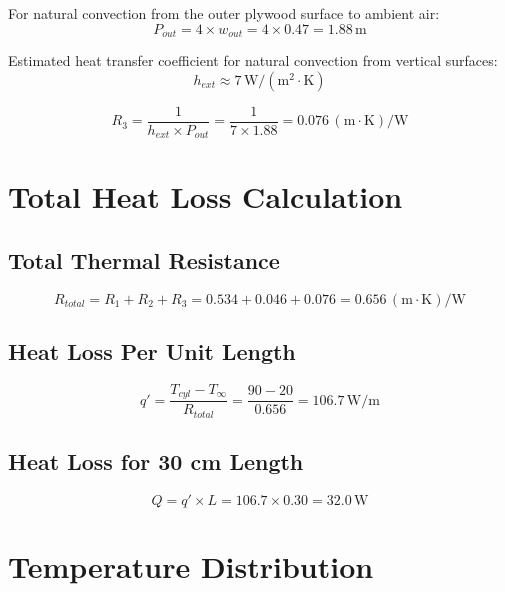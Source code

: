 \documentclass[11pt]{article}
\newcommand{\unit}[1]{\,\mathrm{#1}}
\begin{document}
For natural convection from the outer plywood surface to ambient air:
\begin{equation}
    P_{out} = 4 \times w_{out} = 4 \times 0.47 = 1.88\unit{m}
\end{equation}

Estimated heat transfer coefficient for natural convection from vertical surfaces:
\begin{equation}
    h_{ext} \approx 7\unit{W/(m^2 \cdot K)}
\end{equation}

\begin{equation}
    R_3 = \frac{1}{h_{ext} \times P_{out}} = \frac{1}{7 \times 1.88} = \boxed{0.076\unit{(m \cdot K)/W}}
\end{equation}

\section{Total Heat Loss Calculation}

\subsection{Total Thermal Resistance}
\begin{equation}
    R_{total} = R_1 + R_2 + R_3 = 0.534 + 0.046 + 0.076 = \boxed{0.656\unit{(m \cdot K)/W}}
\end{equation}

\subsection{Heat Loss Per Unit Length}
\begin{equation}
    q' = \frac{T_{cyl} - T_\infty}{R_{total}} = \frac{90 - 20}{0.656} = \boxed{106.7\unit{W/m}}
\end{equation}

\subsection{Heat Loss for 30 cm Length}
\begin{equation}
    Q = q' \times L = 106.7 \times 0.30 = \boxed{32.0\unit{W}}
\end{equation}

\section{Temperature Distribution}
\end{document}
